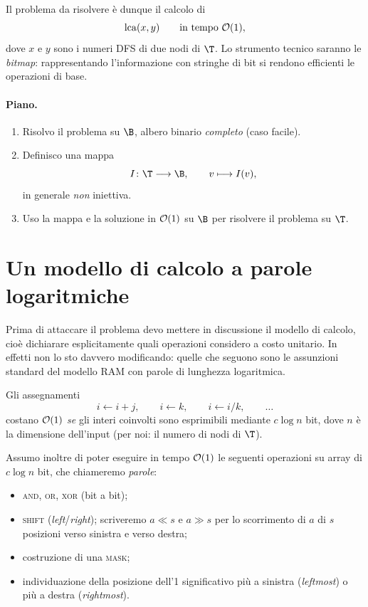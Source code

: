 Il problema da risolvere è dunque il calcolo di
\[
  \operatorname{lca}(x,y) \qquad \text{in tempo } \mathcal{O}(1),
\]
dove $x$ e $y$ sono i numeri DFS di due nodi di $\T$. Lo strumento tecnico saranno le
\emph{bitmap}: rappresentando l'informazione con stringhe di bit si rendono efficienti
le operazioni di base.

\paragraph{Piano.}
\begin{enumerate}
  \item Risolvo il problema su $\B$, albero binario \emph{completo} (caso facile).
  \item Definisco una mappa
  \[
    I \colon \T \longrightarrow \B, \qquad v \longmapsto I(v),
  \]
  in generale \emph{non} iniettiva.
  \item Uso la mappa e la soluzione in $\mathcal{O}(1)$ su $\B$ per risolvere il problema su
  $\T$.
\end{enumerate}

\section{Un modello di calcolo a parole logaritmiche}\label{sec:lca-modello}


Prima di attaccare il problema devo mettere in discussione il modello di calcolo, cioè
dichiarare esplicitamente quali operazioni considero a costo unitario. In effetti non
lo sto davvero modificando: quelle che seguono sono le assunzioni standard del modello
RAM con parole di lunghezza logaritmica.

Gli assegnamenti
\[
  i \leftarrow i+j, \qquad
  i \leftarrow k, \qquad
  i \leftarrow i/k, \qquad \dots
\]
costano $\mathcal{O}(1)$ \emph{se} gli interi coinvolti sono esprimibili mediante $c\log n$
bit, dove $n$ è la dimensione dell'input (per noi: il numero di nodi di $\T$).

Assumo inoltre di poter eseguire in tempo $\mathcal{O}(1)$ le seguenti operazioni su array di
$c\log n$ bit, che chiameremo \emph{parole}:
\begin{itemize}
  \item \textsc{and}, \textsc{or}, \textsc{xor} (bit a bit);
  \item \textsc{shift} (\emph{left}/\emph{right}); scriveremo $a \ll s$ e $a \gg s$ per
        lo scorrimento di $a$ di $s$ posizioni verso sinistra e verso destra;
  \item costruzione di una \textsc{mask};
  \item individuazione della posizione dell'1 significativo più a sinistra
        (\emph{leftmost}) o più a destra (\emph{rightmost}).
\end{itemize}

